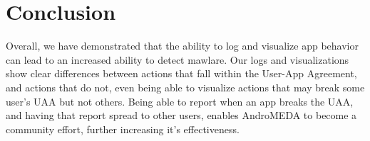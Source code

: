 \section{Conclusion}
Overall, we have demonstrated that the ability to log and visualize app behavior can lead to an increased ability to detect mawlare. Our logs and visualizations show clear differences between actions that fall within the User-App Agreement, and actions that do not, even being able to visualize actions that may break some user's UAA but not others. Being able to report when an app breaks the UAA, and having that report spread to other users, enables AndroMEDA to become a community effort, further increasing it's effectiveness.





